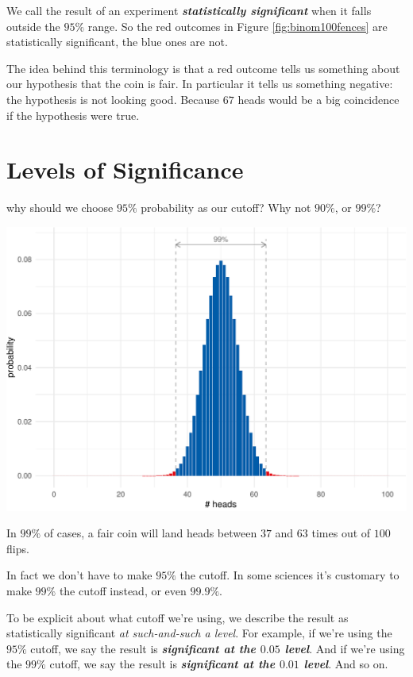 \documentclass[justified]{tufte-book}
\theoremstyle{definition}
\theoremstyle{definition}
\theoremstyle{definition}
\theoremstyle{remark}
\begin{document}
We call the result of an experiment \textbf{\emph{statistically
significant}} when it falls outside the \(95\%\) range. So the red
outcomes in Figure \ref{fig:binom100fences} are statistically
significant, the blue ones are not.

The idea behind this terminology is that a red outcome tells us
something about our hypothesis that the coin is fair. In particular it
tells us something negative: the hypothesis is not looking good. Because
\(67\) heads would be a big coincidence if the hypothesis were true.

\hypertarget{levels-of-significance}{%
\section{Levels of Significance}\label{levels-of-significance}}

 why should we choose \(95\%\) probability as our
cutoff? Why not \(90\%\), or \(99\%\)?

\begin{marginfigure}
\includegraphics{_main_files/figure-latex/binom100fences99-1} \caption[In $99\%$ of cases, a fair coin will land heads between $37$ and $63$ times out of $100$ flips]{In $99\%$ of cases, a fair coin will land heads between $37$ and $63$ times out of $100$ flips.}\label{fig:binom100fences99}
\end{marginfigure}

In fact we don't have to make \(95\%\) the cutoff. In some sciences it's
customary to make \(99\%\) the cutoff instead, or even \(99.9\%\).

To be explicit about what cutoff we're using, we describe the result as
statistically significant \emph{at such-and-such a level}. For example,
if we're using the \(95\%\) cutoff, we say the result is
\textbf{\emph{significant at the \(0.05\) level}}. And if we're using
the \(99\%\) cutoff, we say the result is \textbf{\emph{significant at
the \(0.01\) level}}. And so on.
\end{document}
